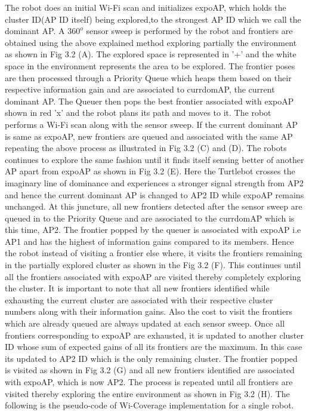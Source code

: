 \par The robot does an initial Wi-Fi scan and initializes expoAP, which holds the cluster ID(AP ID itself) being explored,to the strongest AP ID which we call the dominant AP. A $360^o$ sensor sweep is performed by the robot and frontiers are obtained using the above explained method exploring partially the environment as shown in Fig 3.2 (A). The explored space is represented in '+' and the white space in the environment represents the area to be explored. The frontier poses are then processed through a Priority Queue which heaps them based on their respective information gain and are associated to currdomAP, the current dominant AP. The Queuer then pops the best frontier associated with expoAP shown in red 'x' and the robot plans its path and moves to it. The robot performs a Wi-Fi scan along with the sensor sweep. If the current dominant AP is same as expoAP, new frontiers are queued and associated with the same AP repeating the above process as illustrated in Fig 3.2 (C) and (D). The robots continues to explore the same fashion until it finds itself sensing better of another AP apart from expoAP as shown in Fig 3.2 (E). Here the Turtlebot crosses the imaginary line of dominance and experiences a stronger signal strength from AP2 and hence the current dominant AP is changed to AP2 ID while expoAP remains unchanged. At this juncture, all new frontiers detected after the sensor sweep are queued in to the Priority Queue and are associated to the currdomAP which is this time, AP2. The frontier popped by the queuer is associated with expoAP i.e AP1 and has the highest of information gains compared to its members. Hence the robot instead of visiting a frontier else where, it visits the frontiers remaining in the partially explored cluster as shown in the Fig 3.2 (F). This continues until all the frontiers associated with expoAP are visited thereby completely exploring the cluster. It is important to note that all new frontiers identified while exhausting the current cluster are associated with their respective cluster numbers along with their information gains. Also the cost to visit the frontiers which are already queued are always updated at each sensor sweep. Once all frontiers corresponding to expoAP are exhausted, it is updated to another cluster ID whose sum of expected gains of all its  frontiers are the maximum. In this case its updated to AP2 ID which is the only remaining cluster. The frontier popped is visited as shown in Fig 3.2 (G) and all new frontiers identified are associated with expoAP, which is now AP2. The process is repeated until all frontiers are visited thereby exploring the entire environment as shown in Fig 3.2 (H). The following is the pseudo-code of Wi-Coverage implementation for a single robot.\\
\vspace{1mm}\\

